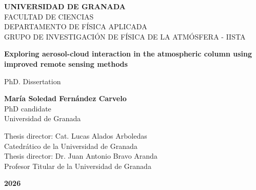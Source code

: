 \begin{center}
    \begin{spacing}{1.3}
    \textbf{\Large UNIVERSIDAD DE GRANADA}\\
    {\large FACULTAD DE CIENCIAS}\\
    {\large DEPARTAMENTO DE FÍSICA APLICADA}\\
    {\large GRUPO DE INVESTIGACIÓN DE FÍSICA DE LA ATMÓSFERA - IISTA}\\
    \end{spacing}
    \end{center}
    
    \vspace{23mm}
    
    \begin{center}
    \begin{spacing}{1.6}
    \textbf{\LARGE Exploring aerosol-cloud interaction in the atmospheric column using improved remote sensing methods}
    \end{spacing}
    \end{center}
    
    \vspace{10 mm}
    
    \begin{center}
    {\Large PhD. Dissertation}
    \end{center}
    
    \vspace{10 mm}
    
    \begin{center}
    \begin{spacing}{1.7}
    \textbf{\Large María Soledad Fernández Carvelo}\\
    {\large PhD candidate}\\
    {\large Universidad de Granada}\\
    \end{spacing}
    \end{center}
    
    \vspace{15 mm}
    
    \begin{center}
    \begin{spacing}{1.5}
        {\Large Thesis director: Cat. Lucas Alados Arboledas}\\
        {\large Catedrático de la Universidad de Granada}\\
        {\Large Thesis director: Dr. Juan Antonio Bravo Aranda}\\
        {\large Profesor Titular de la Universidad de Granada}\\
    \end{spacing}
    \end{center}
    
    \vspace{10 mm}
    
    \begin{center}
        \textbf{\Large 2026}
    \end{center}